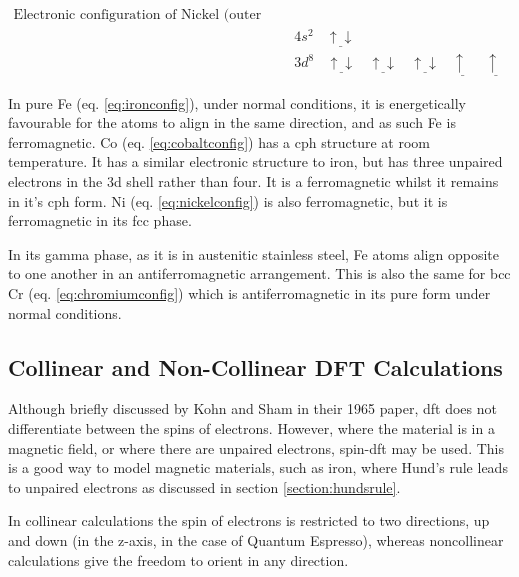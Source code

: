 \begin{equation}
\begin{split}
\text{Electronic configuration of Nickel (outer shells)}\\
&4s^2 \:\:\:\:  \underline{\uparrow \downarrow} \\
&3d^8 \:\:\:\:  \underline{\uparrow \downarrow} \:\:\:\:  \underline{\uparrow  \downarrow} \:\:\:\:  \underline{\uparrow  \downarrow} \:\:\:\: \underline{\uparrow \:\:} \:\:\:\: \underline{\uparrow \:\:}
\end{split}
\label{eq:nickelconfig}
\end{equation}

In pure \Gls{Fe} (eq. \ref{eq:ironconfig}), under normal conditions, it is energetically favourable for the atoms to align in the same direction, and as such \Gls{Fe} is ferromagnetic.  \Gls{Co} (eq. \ref{eq:cobaltconfig}) has a \acrlong{cph} structure at room temperature.  It has a similar electronic structure to iron, but has three unpaired electrons in the 3d shell rather than four.  It is a ferromagnetic whilst it remains in it's \acrshort{cph} form.  \Gls{Ni} (eq. \ref{eq:nickelconfig}) is also ferromagnetic, but it is ferromagnetic in its \acrshort{fcc} phase.

In its gamma phase, as it is in austenitic stainless steel, \Gls{Fe} atoms align opposite to one another in an antiferromagnetic arrangement.  This is also the same for \acrshort{bcc} \Gls{Cr} (eq. \ref{eq:chromiumconfig})  which is antiferromagnetic in its pure form under normal conditions.

 





\subsection{Collinear and Non-Collinear DFT Calculations}

Although briefly discussed by Kohn and Sham in their 1965 paper\cite{kohnsham}, \acrshort{dft} does not differentiate between the spins of electrons.  However, where the material is in a magnetic field, or where there are unpaired electrons, spin-\acrshort{dft} may be used.  This is a good way to model magnetic materials, such as iron, where Hund's rule leads to unpaired electrons as discussed in section \ref{section:hundsrule}.  

In collinear calculations the spin of electrons is restricted to two directions, up and down (in the z-axis, in the case of Quantum Espresso), whereas noncollinear calculations give the freedom to orient in any direction. 

